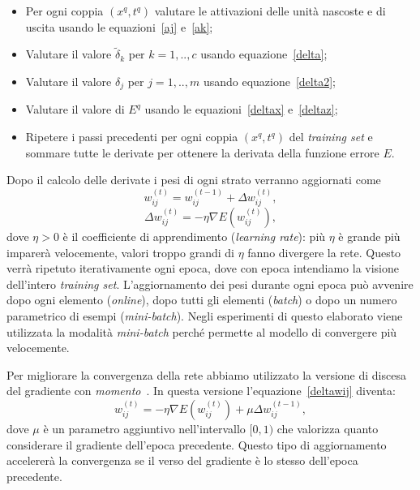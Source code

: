 \documentclass[11pt,a4paper,twoside,
openright]{book}
\begin{document}
\begin{itemize}
\item Per ogni coppia $(x^q,t^q)$ valutare le attivazioni delle unità nascoste e di uscita usando le equazioni~\eqref{aj} e~\eqref{ak};
\item Valutare il valore $\tilde{\delta}_k$ per $k=1,..,c$ usando equazione~\eqref{delta};
\item Valutare il valore $\delta_j$ per $j=1,..,m$ usando equazione~\eqref{delta2};
\item Valutare il valore di $E^q$ usando le equazioni~\eqref{deltax} e~\eqref{deltaz};
\item Ripetere i passi precedenti per ogni coppia $(x^q,t^q)$ del \textit{training set} e sommare tutte le derivate per ottenere la derivata della funzione errore $E$.
\end{itemize}

Dopo il calcolo delle derivate i pesi di ogni strato verranno aggiornati come
\begin{equation}
w_{ij}^{(t)}=w_{ij}^{(t-1)} + \Delta w_{ij}^{(t)},
\label{update_w_ij}
\end{equation}
\begin{equation}
\Delta w_{ij}^{(t)} = -\eta \nabla E(w_{ij}^{(t)}),
\label{deltawij}
\end{equation}
dove $\eta>0$ è il coefficiente di apprendimento (\textit{learning rate}): più $\eta$ è grande più imparerà velocemente, valori troppo grandi di $\eta$ fanno divergere la rete.
Questo verrà ripetuto iterativamente ogni epoca, dove con epoca intendiamo la visione dell'intero \textit{training set}.
L'aggiornamento dei pesi durante ogni epoca può avvenire dopo ogni elemento (\textit{online}), dopo tutti gli elementi (\textit{batch}) o dopo un numero parametrico di esempi (\textit{mini-batch}).
Negli esperimenti di questo elaborato viene utilizzata la modalità \textit{mini-batch} perché permette al modello di convergere più velocemente.

Per migliorare la convergenza della rete abbiamo utilizzato la versione di discesa del gradiente con \textit{momento}~\cite{journals/nn/Qian99}.
In questa versione l'equazione~\eqref{deltawij} diventa:
\begin{equation}
w_{ij}^{(t)}=- \eta \nabla E(w_{ij}^{(t)}) + \mu \Delta w_{ij}^{(t-1)},
\label{momentum}
\end{equation}
dove $\mu$ è un parametro aggiuntivo nell'intervallo $[0,1)$ che valorizza quanto considerare il gradiente dell'epoca precedente. 
Questo tipo di aggiornamento accelererà la convergenza se il verso del gradiente è lo stesso dell'epoca precedente. 
\end{document}
